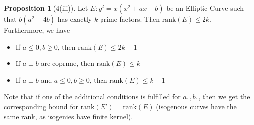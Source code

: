 \documentclass{scrartcl}
\theoremstyle{definition}
\newtheorem{prop}[subsection]{Proposition}
\begin{document}
\begin{prop}[4(iii)]
    \label{prop:rank_bound}
    Let $E: y^2 = x(x^2 + a x + b)$ be an Elliptic Curve such that $b(a^2 - 4b)$ has exactly $k$ prime factors.
    Then $\mathrm{rank}(E) \leq 2k$.
    Furthermore, we have
    \begin{itemize}
        \item If $a \leq 0, b \geq 0$, then $\mathrm{rank}(E) \leq 2k - 1$
        \item If $a \perp b$ are coprime, then $\mathrm{rank}(E) \leq k$
        \item If $a \perp b$ and $a \leq 0, b \geq 0$, then $\mathrm{rank}(E) \leq k - 1$
    \end{itemize}
    Note that if one of the additional conditions is fulfilled for $a_1, b_1$, then we get the corresponding bound for $\mathrm{rank}(E') = \mathrm{rank}(E)$ (isogenous curves have the same rank, as isogenies have finite kernel).
\end{prop}
\end{document}
